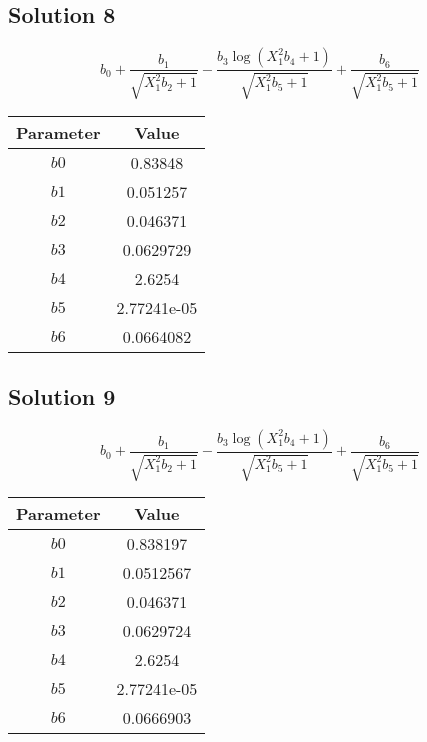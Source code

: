 \documentclass{article}
\begin{document}
\vspace{1em}
\subsection*{Solution 8}
\[
b_{0} + \frac{b_{1}}{\sqrt{X_{1}^{2} b_{2} + 1}} - \frac{b_{3} \log{\left(X_{1}^{2} b_{4} + 1 \right)}}{\sqrt{X_{1}^{2} b_{5} + 1}} + \frac{b_{6}}{\sqrt{X_{1}^{2} b_{5} + 1}}
\]
\begin{center}
\begin{tabular}{cc}
\toprule
Parameter & Value \\
\midrule
$b0$ & 0.83848 \\
$b1$ & 0.051257 \\
$b2$ & 0.046371 \\
$b3$ & 0.0629729 \\
$b4$ & 2.6254 \\
$b5$ & 2.77241e-05 \\
$b6$ & 0.0664082 \\
\bottomrule
\end{tabular}
\end{center}

\vspace{1em}
\subsection*{Solution 9}
\[
b_{0} + \frac{b_{1}}{\sqrt{X_{1}^{2} b_{2} + 1}} - \frac{b_{3} \log{\left(X_{1}^{2} b_{4} + 1 \right)}}{\sqrt{X_{1}^{2} b_{5} + 1}} + \frac{b_{6}}{\sqrt{X_{1}^{2} b_{5} + 1}}
\]
\begin{center}
\begin{tabular}{cc}
\toprule
Parameter & Value \\
\midrule
$b0$ & 0.838197 \\
$b1$ & 0.0512567 \\
$b2$ & 0.046371 \\
$b3$ & 0.0629724 \\
$b4$ & 2.6254 \\
$b5$ & 2.77241e-05 \\
$b6$ & 0.0666903 \\
\bottomrule
\end{tabular}
\end{center}

\vspace{1em}
\end{document}
